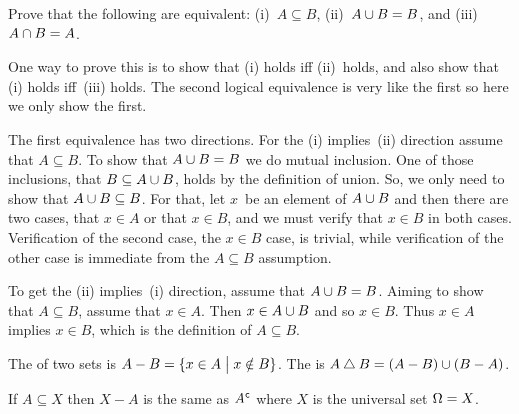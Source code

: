 \documentclass{ibl}  %
\begin{document}
\begin{problem}[\maxlength] 
Prove that the following are equivalent:
(i)~$A\subseteq B$,
(ii)~$A\cup B=B$,    
and (iii)~$A\cap B=A$.
\begin{answer}
One way to prove this is to 
show that (i) holds iff (ii)~holds, and also show that (i) holds iff~(iii) 
holds.
The second logical equivalence
is very like the first so here we only show the first.

The first equivalence has two directions.
For the (i) implies~(ii) direction assume that $A\subseteq B$. 
To show that $A\cup B=B$ we do mutual inclusion.
One of those inclusions, that $B\subseteq A\cup B$, holds by the definition 
of union.
So, we only need to show that $A\cup B\subseteq B$.
For that, let $x$~be an element of $A\cup B$ and then
there are two cases, that $x\in A$ or that $x\in B$, and
we must verify that $x\in B$ in both cases.
Verification of the second case, the $x\in B$ case, is trivial,
while verification of the other case is 
immediate from the $A\subseteq B$ assumption.

To get the (ii) implies~(i) direction, assume that $A\cup B=B$.
Aiming to show that $A\subseteq B$, assume that $x\in A$.
Then $x\in A\cup B$ and so $x\in B$.
Thus $x\in A$ implies $x\in B$, which is the definition of $A\subseteq B$.
\end{answer}
\end{problem}

\begin{df}
The  of two sets 
is $A-B=\{x\in A \bigm| x\notin B\}$.  
The  is 
$A\mathbin{\triangle} B=(A-B)\cup(B-A)$.
\end{df}

\noindent If $A\subseteq X$ then $X-A$ is the same as ${A}^{\mspace{1mu}\mathsf{c}}$
where $X$ is the universal set $\Omega=X$.     

\end{document}
